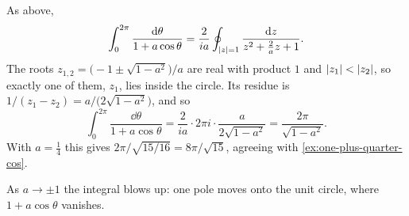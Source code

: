 \begin{solution}
  As above,
  \[
    \int_0^{2\pi} \frac{\mathop{}\!\mathrm{d}\theta}{1 + a\cos\theta}
    = \frac{2}{ia} \oint_{\lvert z\rvert = 1} \frac{\mathop{}\!\mathrm{d} z}{z^2 + \frac{2}{a} z + 1}.
  \]
  The roots $z_{1,2} = \bigl(-1 \pm \sqrt{1 - a^2}\bigr)/a$ are real with
  product $1$ and $\lvert z_1\rvert < \lvert z_2\rvert$, so exactly one of them, $z_1$, lies
  inside the circle. Its residue is
  $1/(z_1 - z_2) = a / \bigl(2\sqrt{1 - a^2}\bigr)$, and so
  \[
    \int_0^{2\pi} \frac{\dd\theta}{1 + a\cos\theta}
    = \frac{2}{ia} \cdot 2\pi i \cdot \frac{a}{2\sqrt{1 - a^2}}
    = \frac{2\pi}{\sqrt{1 - a^2}}.
  \]
  With $a = \frac14$ this gives $2\pi / \sqrt{15/16} = 8\pi / \sqrt{15}$,
  agreeing with \cref{ex:one-plus-quarter-cos}.
\end{solution}

\begin{remark}
  As $a \to \pm 1$ the integral blows up: one pole moves onto the unit circle,
  where $1 + a\cos\theta$ vanishes.
\end{remark}
